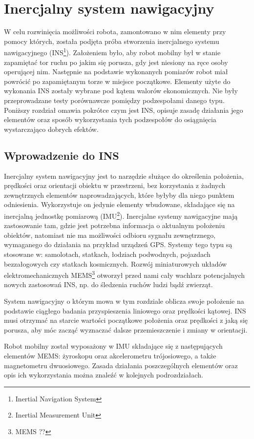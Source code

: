 \section{Inercjalny system nawigacyjny}
W celu rozwinięcia możliwości robota, zamontowano w nim elementy przy pomocy
których, została podjęta próba stworzenia inercjalnego systemu nawigacyjnego
(INS\footnote{Inertial Navigation System}). Założeniem było, aby robot mobilny
był w stanie zapamiętać tor ruchu po jakim się porusza, gdy jest niesiony na ręce
osoby operującej nim. Następnie na podstawie wykonanych pomiarów robot miał
powrócić po zapamiętanym torze w miejsce początkowe. Elementy użyte do wykonania
INS zostały wybrane pod kątem walorów ekonomicznych. Nie były przeprowadzane
testy porównawcze pomiędzy podzespołami danego typu. Poniższy rozdział omawia
pokrótce czym jest INS, opisuje zasadę działania jego elementów oraz sposób
wykorzystania tych podzespołów do osiągnięcia wystarczająco dobrych efektów.

\subsection{Wprowadzenie do INS}

Inercjalny system nawigacyjny jest to narzędzie służące do określenia położenia,
prędkości oraz orientacji obiektu w przestrzeni, bez korzystania z żadnych
zewnętrznych elementów naprowadzających, które byłyby dla niego punktem
odniesienia. Wykorzystuje on jedynie elementy wbudowane, składające się na
inercjalną jednostkę pomiarową (IMU\footnote{Inertial Measurement Unit}).
Inercjalne systemy nawigacyjne mają zastosowanie tam, gdzie jest potrzebna
informacja o aktualnym położeniu obiektów, natomiast nie ma możliwości odbioru
sygnału zewnętrznego, wymaganego do działania na przykład urządzeń GPS. Systemy
tego typu są stosowane w: samolotach, statkach, łodziach podwodnych, pojazdach
bezzałogowych czy statkach kosmicznych. Rozwój miniaturowych układów
elektromechanicznych MEMS\footnote{MEMS ?? } otworzył przed nami cały
wachlarz potencjalnych nowych zastosowań INS, np. do śledzenia ruchów ludzi bądź
zwierząt.

System nawigacyjny o którym mowa w tym rozdziale oblicza swoje położenie na
podstawie ciągłego badania przyspieszenia liniowego oraz prędkości kątowej. INS
musi otrzymać na starcie wartości początkowe położenia oraz prędkości z jaką się
porusza, aby móc zacząć wyznaczać dalsze przemieszczenie i zmiany w orientacji.

Robot mobilny został wyposażony w IMU składające się z następujących elementów
MEMS: żyroskopu oraz akcelerometru trójosiowego, a także magnetometru
dwuosiowego. Zasada działania poszczególnych elementów oraz opis ich
wykorzystania można znaleźć w kolejnych podrozdziałach.
